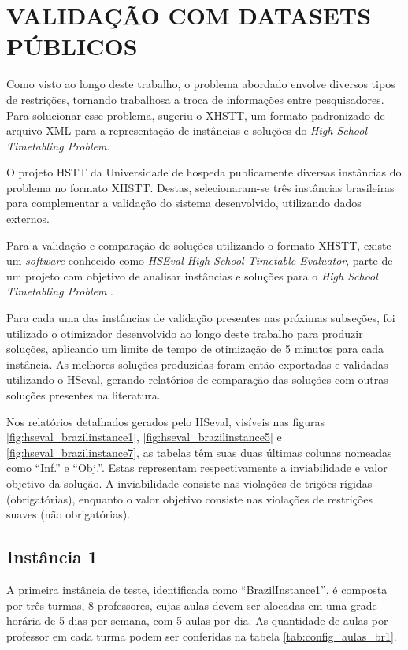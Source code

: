 \section{VALIDAÇÃO COM DATASETS PÚBLICOS}
\label{sec:validacao_datasets}

Como visto ao longo deste trabalho, o problema abordado envolve diversos tipos de restrições, tornando trabalhosa a troca de informações entre pesquisadores. Para solucionar esse problema,  sugeriu o XHSTT, um formato padronizado de arquivo XML para a representação de instâncias e soluções do \textit{High School Timetabling Problem}.

O projeto HSTT da Universidade de  hospeda publicamente diversas instâncias do problema no formato XHSTT. Destas, selecionaram-se três instâncias brasileiras para complementar a validação do sistema desenvolvido, utilizando dados externos.

Para a validação e comparação de soluções utilizando o formato XHSTT, existe um \textit{software} conhecido como \textit{HSEval High School Timetable Evaluator}, parte de um projeto com objetivo de analisar instâncias e soluções para o \textit{High School Timetabling Problem} \cite{HSEval}.

Para cada uma das instâncias de validação presentes nas próximas subseções, foi utilizado o otimizador desenvolvido ao longo deste trabalho para produzir soluções, aplicando um limite de tempo de otimização de 5 minutos para cada instância. As melhores soluções produzidas foram então exportadas e validadas utilizando o HSeval, gerando relatórios de comparação das soluções com outras soluções presentes na literatura.

Nos relatórios detalhados gerados pelo HSeval, visíveis nas figuras \ref{fig:hseval_brazilinstance1}, \ref{fig:hseval_brazilinstance5} e \ref{fig:hseval_brazilinstance7}, as tabelas têm suas duas últimas colunas nomeadas como ``Inf.'' e ``Obj.''. Estas representam respectivamente a inviabilidade e valor objetivo da solução. A inviabilidade consiste nas violações de trições rígidas (obrigatórias), enquanto o valor objetivo consiste nas violações de restrições suaves (não obrigatórias).

\newpage
\subsection{Instância 1}

A primeira instância de teste, identificada como ``BrazilInstance1'', é composta por três turmas, 8 professores, cujas aulas devem ser alocadas em uma grade horária de 5 dias por semana, com 5 aulas por dia. As quantidade de aulas por professor em cada turma podem ser conferidas na tabela \ref{tab:config_aulas_br1}.

